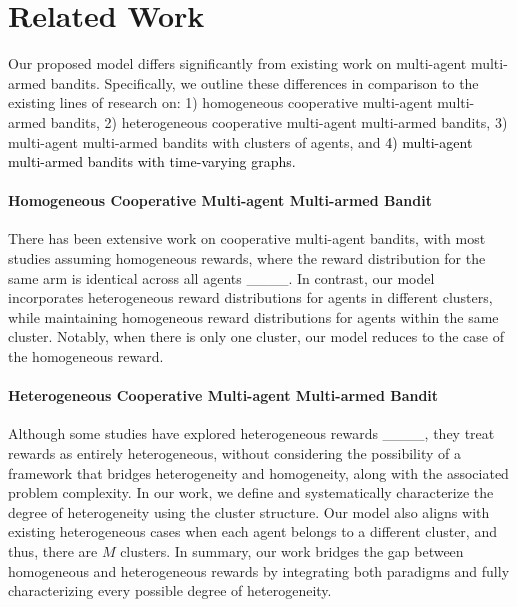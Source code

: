 \section{Related Work}
\label{sec:2.2}


Our proposed model differs significantly from existing work on multi-agent multi-armed bandits. Specifically, we outline these differences in comparison to the existing lines of research on: 1) homogeneous cooperative multi-agent multi-armed bandits, 2) heterogeneous cooperative multi-agent multi-armed bandits, 3) multi-agent multi-armed bandits with clusters of agents, and \textcolor{black}{4) multi-agent multi-armed bandits with time-varying graphs.}

\paragraph{Homogeneous Cooperative Multi-agent Multi-armed Bandit} 
There has been extensive work on cooperative multi-agent bandits, with most studies assuming homogeneous rewards, where the reward distribution for the same arm is identical across all agents ____. In contrast, our model incorporates heterogeneous reward distributions for agents in different clusters, while maintaining homogeneous reward distributions for agents within the same cluster. Notably, when there is only one cluster, our model reduces to the case of the homogeneous reward. 

\paragraph{Heterogeneous Cooperative Multi-agent Multi-armed Bandit} Although some studies have explored heterogeneous rewards ____, they treat rewards as entirely heterogeneous, without considering the possibility of a framework that bridges heterogeneity and homogeneity, along with the associated problem complexity. In our work, we define and systematically characterize the degree of heterogeneity using the cluster structure. Our model also aligns with existing heterogeneous cases when each agent belongs to a different cluster, and thus, there are $M$ clusters. In summary, our work bridges the gap between homogeneous and heterogeneous rewards by integrating both paradigms and fully characterizing every possible degree of heterogeneity.

